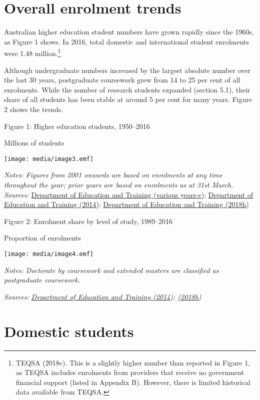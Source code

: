 \documentclass[]{book}
\begin{document}
\hypertarget{overall-enrolment-trends}{%
\section{Overall enrolment trends}\label{overall-enrolment-trends}}

Australian higher education student numbers have grown rapidly since the 1960s, as Figure 1 shows. In 2016, total domestic and international student enrolments were 1.48 million.\footnote{TEQSA (2018c). This is a slightly higher number than reported in Figure 1, as TEQSA includes enrolments from providers that receive no government financial support (listed in Appendix B). However, there is limited historical data available from TEQSA.}

Although undergraduate numbers increased by the largest absolute number over the last 30 years, postgraduate coursework grew from 14 to 25 per cent of all enrolments. While the number of research students expanded (section 5.1), their share of all students has been stable at around 5 per cent for many years. Figure 2 shows the trends.

\protect\hypertarget{_Ref395097689}{}{}Figure 1: Higher education students, 1950--2016

Millions of students

\texttt{[image: media/image3.emf]}

\emph{Notes: Figures from 2001 onwards are based on enrolments at any time throughout the year; prior years are based on enrolments as at 31st March.\\
Sources:} \protect\hyperlink{_ENREF_114}{Department of Education and Training (various years-c}); \protect\hyperlink{_ENREF_60}{Department of Education and Training (2014}); \protect\hyperlink{_ENREF_87}{Department of Education and Training (2018h})

\protect\hypertarget{_Ref383095055}{}{}Figure 2: Enrolment share by level of study, 1989--2016

Proportion of enrolments

\texttt{[image: media/image4.emf]}

\emph{Notes: Doctorate by coursework and extended masters are classified as postgraduate coursework. }

\emph{Sources:} \emph{\protect\hyperlink{_ENREF_60}{Department of Education and Training (2014}); \protect\hyperlink{_ENREF_87}{(2018h})}

\hypertarget{domestic-students}{%
\section{Domestic students }\label{domestic-students}}
\end{document}
